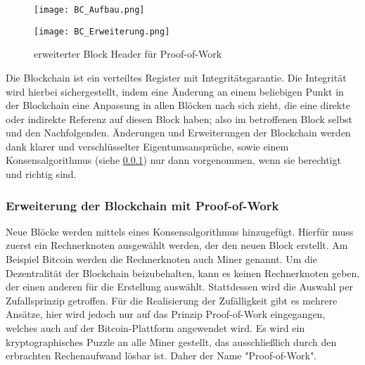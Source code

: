 \begin{figure}[!h]
    \begin{minipage}{.66\textwidth}
        \texttt{[image: BC\_Aufbau.png]}
        \label{fig:BC_Aufbau}
    \end{minipage}
    \begin{minipage}{.33\textwidth}
        \texttt{[image: BC\_Erweiterung.png]}
        \caption{erweiterter Block Header für Proof-of-Work}
        \label{fig:BC_Erweiterung}
    \end{minipage}
\end{figure}


Die Blockchain ist  ein verteiltes Register mit Integritätsgarantie. Die Integrität 
wird hierbei sichergestellt, indem eine Änderung an einem beliebigen Punkt in der
Blockchain eine Anpassung in allen Blöcken nach sich zieht, die eine direkte oder
indirekte Referenz auf diesen Block haben; also im betroffenen Block selbst und den
Nachfolgenden. Änderungen und Erweiterungen der Blockchain werden dank klarer 
und verschlüsselter Eigentumsansprüche, sowie einem Konsensalgorithmus (siehe \ref{sec:Erweiterung})
nur dann vorgenommen, wenn sie berechtigt und richtig sind.
\cite[p.~22]{fill2020blockchain} 

\subsubsection{Erweiterung der Blockchain mit Proof-of-Work}
\label{sec:Erweiterung}
Neue Blöcke werden mittels eines Konsensalgorithmus hinzugefügt.
Hierfür muss zuerst ein Rechnerknoten ausgewählt werden, der den neuen Block erstellt. 
Am Beispiel Bitcoin werden die Rechnerknoten auch \glqq Miner\grqq{} genannt.
Um die Dezentralität der Blockchain beizubehalten, kann es keinen Rechnerknoten geben, der einen 
anderen für die Erstellung auswählt. Stattdessen wird die Auswahl per Zufallsprinzip getroffen.
Für die Realisierung der Zufälligkeit gibt es mehrere Ansätze, hier wird jedoch nur auf das
Prinzip \glqq Proof-of-Work\grqq{} eingegangen, welches auch auf der Bitcoin-Plattform angewendet wird.
Es wird ein kryptographisches Puzzle an alle Miner gestellt, das ausschließlich
durch den erbrachten Rechenaufwand lösbar ist. Daher der Name "Proof-of-Work". 

